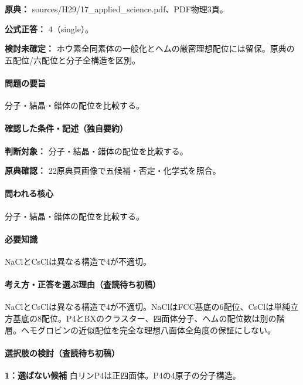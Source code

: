 \noindent\textbf{原典：} sources/H29/17\_applied\_science.pdf、PDF物理3頁。

\textbf{公式正答：} 4（single）。

\par\textbf{検討未確定：} ホウ素全同素体の一般化とヘムの厳密理想配位には留保。原典の五配位/六配位と分子全構造を区別。

\paragraph{問題の要旨} 分子・結晶・錯体の配位を比較する。

\paragraph{確認した条件・記述（独自要約）}\mbox{}\par

\noindent\textbf{判断対象：} 分子・結晶・錯体の配位を比較する。\par

\noindent\textbf{原典確認：} 22原典頁画像で五候補・否定・化学式を照合。\par

\paragraph{問われる核心} 分子・結晶・錯体の配位を比較する。

\paragraph{必要知識} NaClとCsClは異なる構造で4が不適切。

\paragraph{考え方・正答を選ぶ理由（査読待ち初稿）} NaClとCsClは異なる構造で4が不適切。NaClはFCC基底の6配位、CsClは単純立方基底の8配位。P4とBXのクラスター、四面体分子、ヘムの配位数は別の階層。ヘモグロビンの近似配位を完全な理想八面体全角度の保証にしない。

\paragraph{選択肢の検討（査読待ち初稿）}\mbox{}\par

\noindent\textbf{1：選ばない候補} 白リンP4は正四面体。P4の4原子の分子構造。\par

